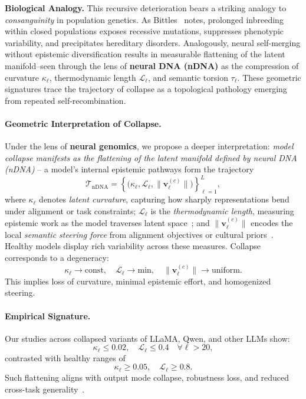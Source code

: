 \textbf{Biological Analogy.} This recursive deterioration bears a striking analogy to \textit{consanguinity} in population genetics. As Bittles~\cite{bittles2001consanguinity} notes, prolonged inbreeding within closed populations exposes recessive mutations, suppresses phenotypic variability, and precipitates hereditary disorders. Analogously, neural self-merging without epistemic diversification results in measurable flattening of the latent manifold--seen through the lens of \textbf{neural DNA (nDNA)} as the compression of curvature $\kappa_\ell$, thermodynamic length $\mathcal{L}_\ell$, and semantic torsion $\tau_\ell$. These geometric signatures trace the trajectory of collapse as a topological pathology emerging from repeated self-recombination.














\paragraph{Geometric Interpretation of Collapse.}
Under the lens of \textbf{neural genomics}, we propose a deeper interpretation: \emph{model collapse manifests as the flattening of the latent manifold defined by neural DNA (nDNA)} -- a model’s internal epistemic pathways form the trajectory
\[
\mathcal{T}_{\mathrm{nDNA}} = \left\{ \big( \kappa_\ell, \mathcal{L}_\ell, \| \mathbf{v}_\ell^{(c)} \| \big) \right\}_{\ell=1}^{L},
\]
where $\kappa_\ell$ denotes \emph{latent curvature}, capturing how sharply representations bend under alignment or task constraints; $\mathcal{L}_\ell$ is the \emph{thermodynamic length}, measuring epistemic work as the model traverses latent space~\citep{amari2016information, liu2022understanding}; and $\| \mathbf{v}_\ell^{(c)} \|$ encodes the local \emph{semantic steering force} from alignment objectives or cultural priors~\citep{peng2024cultural, xiang2024cultural}. Healthy models display rich variability across these measures. Collapse corresponds to a degeneracy:
\[
\kappa_\ell \to \mathrm{const}, \quad \mathcal{L}_\ell \to \mathrm{min}, \quad \| \mathbf{v}_\ell^{(c)} \| \to \mathrm{uniform}.
\]
This implies loss of curvature, minimal epistemic effort, and homogenized steering.

\paragraph{Empirical Signature.}
Our studies across collapsed variants of LLaMA, Qwen, and other LLMs show:
\[
\kappa_\ell \leq 0.02, \quad \mathcal{L}_\ell \leq 0.4 \quad \forall \ell > 20,
\]
contrasted with healthy ranges of
\[
\kappa_\ell \geq 0.05, \quad \mathcal{L}_\ell \geq 0.8.
\]
Such flattening aligns with output mode collapse, robustness loss, and reduced cross-task generality~\citep{zhang2023languagecollapse, rafailov2023direct}.

